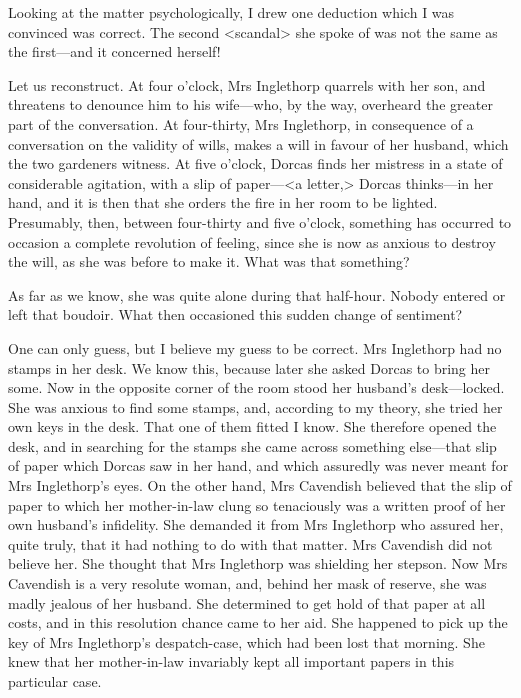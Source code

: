  Looking at the matter psychologically, I drew one deduction which I was convinced was correct. The second <scandal> she spoke of was not the same as the first—and it concerned herself! 

 Let us reconstruct. At four o'clock, Mrs Inglethorp quarrels with her son, and threatens to denounce him to his wife—who, by the way, overheard the greater part of the conversation. At four-thirty, Mrs Inglethorp, in consequence of a conversation on the validity of wills, makes a will in favour of her husband, which the two gardeners witness. At five o'clock, Dorcas finds her mistress in a state of considerable agitation, with a slip of paper—<a letter,> Dorcas thinks—in her hand, and it is then that she orders the fire in her room to be lighted. Presumably, then, between four-thirty and five o'clock, something has occurred to occasion a complete revolution of feeling, since she is now as anxious to destroy the will, as she was before to make it. What was that something? 

 As far as we know, she was quite alone during that half-hour. Nobody entered or left that boudoir. What then occasioned this sudden change of sentiment? 

 One can only guess, but I believe my guess to be correct. Mrs Inglethorp had no stamps in her desk. We know this, because later she asked Dorcas to bring her some. Now in the opposite corner of the room stood her husband's desk—locked. She was anxious to find some stamps, and, according to my theory, she tried her own keys in the desk. That one of them fitted I know. She therefore opened the desk, and in searching for the stamps she came across something else—that slip of paper which Dorcas saw in her hand, and which assuredly was never meant for Mrs Inglethorp's eyes. On the other hand, Mrs Cavendish believed that the slip of paper to which her mother-in-law clung so tenaciously was a written proof of her own husband's infidelity. She demanded it from Mrs Inglethorp who assured her, quite truly, that it had nothing to do with that matter. Mrs Cavendish did not believe her. She thought that Mrs Inglethorp was shielding her stepson. Now Mrs Cavendish is a very resolute woman, and, behind her mask of reserve, she was madly jealous of her husband. She determined to get hold of that paper at all costs, and in this resolution chance came to her aid. She happened to pick up the key of Mrs Inglethorp's despatch-case, which had been lost that morning. She knew that her mother-in-law invariably kept all important papers in this particular case. 

